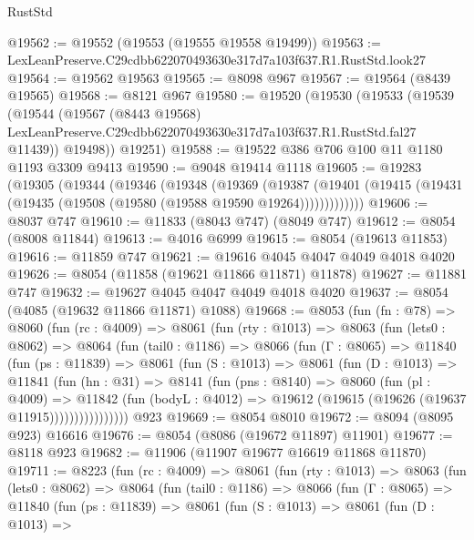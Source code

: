 \begin{lexlean}{RustStd}
\begin{coremodule}
@19562 := @19552 (@19553 (@19555 @19558 @19499))
@19563 := LexLeanPreserve.C29cdbb622070493630e317d7a103f637.R1.RustStd.look27
@19564 := @19562 @19563
@19565 := @8098 @967
@19567 := @19564 (@8439 @19565)
@19568 := @8121 @967
@19580 := @19520
    (@19530
      (@19533
        (@19539
          (@19544
            (@19567
              (@8443 @19568)
              LexLeanPreserve.C29cdbb622070493630e317d7a103f637.R1.RustStd.fal27
              @11439))
          @19498))
      @19251)
@19588 := @19522 @386 @706 @100 @11 @1180 @1193 @3309 @9413
@19590 := @9048 @19414 @1118
@19605 := @19283
    (@19305
      (@19344
        (@19346
          (@19348
            (@19369
              (@19387
                (@19401 (@19415 (@19431 (@19435 (@19508 (@19580 (@19588 @19590 @19264)))))))))))))
@19606 := @8037 @747
@19610 := @11833 (@8043 @747) (@8049 @747)
@19612 := @8054 (@8008 @11844)
@19613 := @4016 @6999
@19615 := @8054 (@19613 @11853)
@19616 := @11859 @747
@19621 := @19616 @4045 @4047 @4049 @4018 @4020
@19626 := @8054 (@11858 (@19621 @11866 @11871) @11878)
@19627 := @11881 @747
@19632 := @19627 @4045 @4047 @4049 @4018 @4020
@19637 := @8054 (@4085 (@19632 @11866 @11871) @1088)
@19668 := @8053
    (fun (fn : @78) =>
    @8060
      (fun (rc : @4009) =>
      @8061
        (fun (rty : @1013) =>
        @8063
          (fun (lets0 : @8062) =>
          @8064
            (fun (tail0 : @1186) =>
            @8066
              (fun (Γ : @8065) =>
              @11840
                (fun (ps : @11839) =>
                @8061
                  (fun (S : @1013) =>
                  @8061
                    (fun (D : @1013) =>
                    @11841
                      (fun (hn : @31) =>
                      @8141
                        (fun (pns : @8140) =>
                        @8060
                          (fun (pl : @4009) =>
                          @11842
                            (fun (bodyL : @4012) =>
                            @19612 (@19615 (@19626 (@19637 @11915))))))))))))))))
    @923
@19669 := @8054 @8010
@19672 := @8094 (@8095 @923) @16616
@19676 := @8054 (@8086 (@19672 @11897) @11901)
@19677 := @8118 @923
@19682 := @11906 (@11907 @19677 @16619 @11868 @11870)
@19711 := @8223
    (fun (rc : @4009) =>
    @8061
      (fun (rty : @1013) =>
      @8063
        (fun (lets0 : @8062) =>
        @8064
          (fun (tail0 : @1186) =>
          @8066
            (fun (Γ : @8065) =>
            @11840
              (fun (ps : @11839) =>
              @8061
                (fun (S : @1013) =>
                @8061
                  (fun (D : @1013) =>

\end{coremodule}
\end{lexlean}
